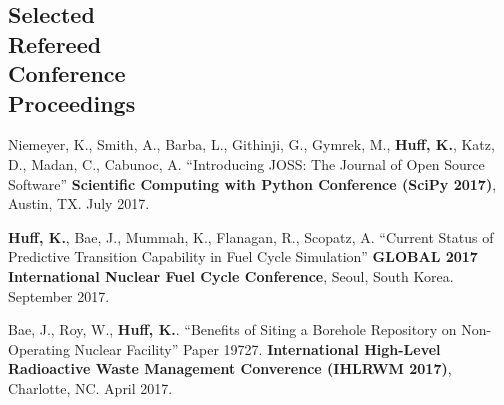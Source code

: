 \documentclass[margin,line]{resume}
\begin{document}
\begin{resume}
    \section{\mysidestyle Selected\\Refereed\\Conference\\Proceedings}
    \begin{bibenum}
    \item Niemeyer, K., Smith, A., Barba, L., Githinji, G., Gymrek, M., 
            \textbf{Huff, K.}, Katz, D., Madan, C., Cabunoc, A. ``Introducing 
            JOSS: The Journal of Open Source Software'' \textbf{Scientific 
            Computing with Python Conference (SciPy 2017)}, Austin, TX. July 
            2017.
    \item \textbf{Huff, K.}, Bae, J., Mummah, K., Flanagan, R., Scopatz, A.
            ``Current Status of Predictive Transition Capability in Fuel Cycle 
            Simulation'' \textbf{GLOBAL 2017 International Nuclear Fuel Cycle 
            Conference}, Seoul, South Korea. September 2017.
      \item Bae, J., Roy, W., \textbf{Huff, K.}.
            ``Benefits of Siting a Borehole Repository on Non-Operating Nuclear 
            Facility'' Paper 19727.  \textbf{International High-Level Radioactive 
            Waste Management Converence (IHLRWM 2017)},
            Charlotte, NC. April 2017. 

\end{bibenum}
\end{resume}
\end{document}

